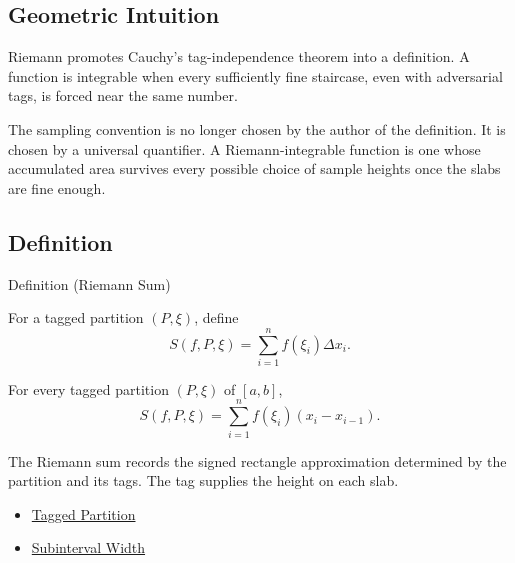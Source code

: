 \subsection*{Geometric Intuition}

\begin{exposition}
Riemann promotes Cauchy's tag-independence theorem into a definition. A
function is integrable when every sufficiently fine staircase, even with
adversarial tags, is forced near the same number.
\end{exposition}

\begin{remark*}[Interpretation]
The sampling convention is no longer chosen by the author of the definition.
It is chosen by a universal quantifier. A Riemann-integrable function is one
whose accumulated area survives every possible choice of sample heights once
the slabs are fine enough.
\end{remark*}

\subsection*{Definition}

\begin{definitionbox}{Definition (Riemann Sum)}
\begin{definition}
\label{def:riemann-sum}
For a tagged partition \((P,\xi)\), define
\[
  S(f,P,\xi)=\sum_{i=1}^{n}f(\xi_i)\Delta x_i.
\]
\end{definition}
\end{definitionbox}

\begin{remark*}
For every tagged partition \((P,\xi)\) of \([a,b]\),
\[
  S(f,P,\xi)=\sum_{i=1}^{n}f(\xi_i)(x_i-x_{i-1}).
\]
\end{remark*}

\begin{remark*}[Interpretation]
The Riemann sum records the signed rectangle approximation determined by the
partition and its tags. The tag supplies the height on each slab.
\end{remark*}

\begin{dependencies}
\begin{itemize}
  \item \hyperref[def:tagged-partition-integration]{Tagged Partition}
  \item \hyperref[def:subinterval-width-integration]{Subinterval Width}
\end{itemize}
\end{dependencies}

